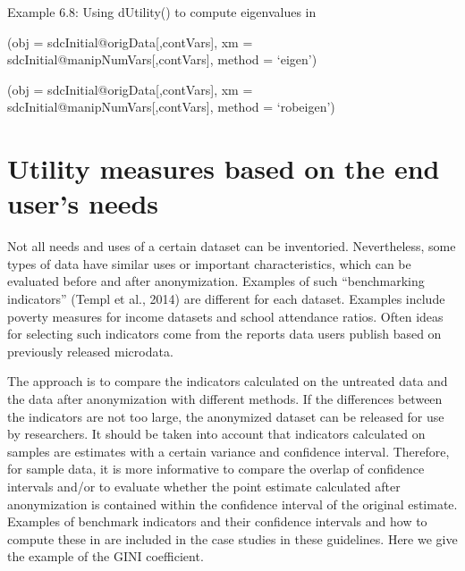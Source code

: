 \documentclass[letterpaper,10pt,english]{sphinxmanual}
\begin{document}
Example 6.8: Using dUtility() to compute eigenvalues in 

\begin{DUlineblock}{0em}
\item[] 
\item[] (obj = sdcInitial@origData{[},contVars{]}, xm =
sdcInitial@manipNumVars{[},contVars{]}, method = ‘eigen’)
\end{DUlineblock}


\begin{DUlineblock}{0em}
\item[] 
\item[] (obj = sdcInitial@origData{[},contVars{]}, xm =
sdcInitial@manipNumVars{[},contVars{]}, method = ‘robeigen’)
\end{DUlineblock}



\section{Utility measures based on the end user’s needs}
\label{\detokenize{utility:utility-measures-based-on-the-end-users-needs}}
Not all needs and uses of a certain dataset can be inventoried.
Nevertheless, some types of data have similar uses or important
characteristics, which can be evaluated before and after anonymization.
Examples of such “benchmarking indicators” (Templ et al., 2014) are
different for each dataset. Examples include poverty measures for income
datasets and school attendance ratios. Often ideas for selecting such
indicators come from the reports data users publish based on previously
released microdata.

The approach is to compare the indicators calculated on the untreated
data and the data after anonymization with different methods. If the
differences between the indicators are not too large, the anonymized
dataset can be released for use by researchers. It should be taken into
account that indicators calculated on samples are estimates with a
certain variance and confidence interval. Therefore, for sample data, it
is more informative to compare the overlap of confidence intervals
and/or to evaluate whether the point estimate calculated after
anonymization is contained within the confidence interval of the
original estimate. Examples of benchmark indicators and their confidence
intervals and how to compute these in  are included in the case
studies in these guidelines. Here we give the example of the GINI
coefficient.
\end{document}
